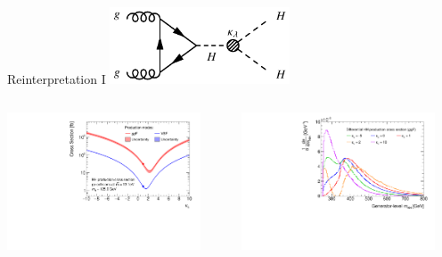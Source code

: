 \documentclass[11pt, xcolor={dvipsnames}, aspectratio=169]{beamer}
\begin{document}
\begin{frame}{Reinterpretation I}
  \includegraphics[width=0.4\textwidth]{feynman_graphs/di_higgs_effective}

  \begin{columns}
    \centering
    \includegraphics[width=0.9\textwidth]{self_coupling/hh_xsec}

    \centering
    \includegraphics[width=0.9\textwidth]{self_coupling/hh_mhh_vs_klam}
  \end{columns}
\end{frame}

\end{document}
